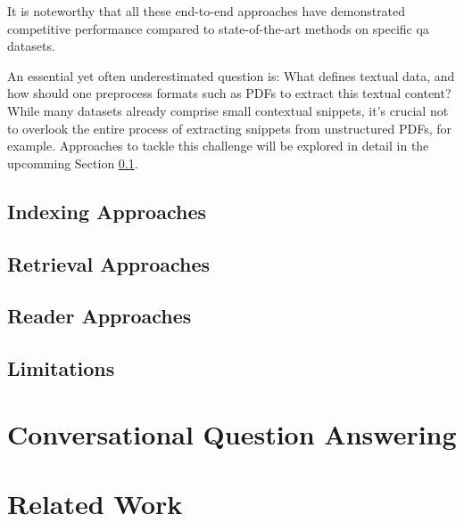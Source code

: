 It is noteworthy that all these end-to-end approaches have demonstrated competitive performance compared to state-of-the-art methods on specific \gls{qa} datasets.

An essential yet often underestimated question is: What defines textual data, and how should one preprocess formats such as PDFs to extract this textual content? While many datasets already comprise small contextual snippets, it's crucial not to overlook the entire process of extracting snippets from unstructured PDFs, for example. Approaches to tackle this challenge will be explored in detail in the upcomming Section \ref{subsec:qa_indexing}.

\subsection{Indexing Approaches}
\label{subsec:qa_indexing}

\subsection{Retrieval Approaches}
\label{subsec:qa_retrieval}

\subsection{Reader Approaches}
\label{subsec:qa_user_interaction}


\subsection{Limitations}
\label{subsec:qa_limitations}

\section{Conversational Question Answering}
\label{sec:cqa}

\section{Related Work}
\label{sec:related_work}